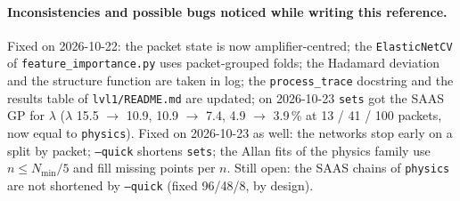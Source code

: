 \documentclass[10pt]{article}
\newcommand{\code}[1]{\texttt{#1}}
\begin{document}
\paragraph{Inconsistencies and possible bugs noticed while writing this reference.} Fixed on 2026-10-22: the packet state is
now amplifier-centred; the \code{ElasticNetCV} of \code{feature\_importance.py} uses packet-grouped folds; the Hadamard
deviation and the structure function are taken in log; the \code{process\_trace} docstring and the results table of
\code{lvl1/README.md} are updated; on 2026-10-23 \code{sets} got the SAAS GP for $\lambda$ ($\lambda$ 15.5 $\to$ 10.9,
10.9 $\to$ 7.4, 4.9 $\to$ 3.9\,\% at 13 / 41 / 100 packets, now equal to \code{physics}). Fixed on 2026-10-23 as well: the networks stop early on a split by packet; \code{--quick} shortens \code{sets}; the
Allan fits of the physics family use $n \le N_{\min}/5$ and fill missing points per $n$. Still open: the SAAS chains
of \code{physics} are not shortened by \code{--quick} (fixed 96/48/8, by design).
\end{document}
